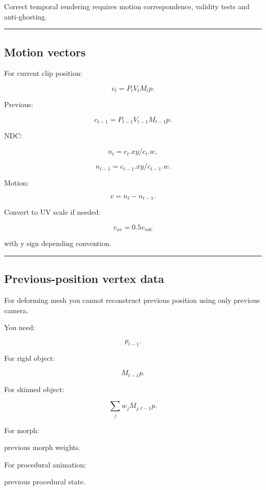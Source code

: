 Correct temporal rendering requires motion correspondence, validity tests and anti-ghosting.

\begin{center}\rule{0.5\linewidth}{0.5pt}\end{center}

\subsection{Motion vectors}\label{04-visual-computing-ii-ch040-motion-vectors}

For current clip position:

\[
c_t=
P_tV_tM_tp.
\]

Previous:

\[
c_{t-1}
=
P_{t-1}
V_{t-1}
M_{t-1}
p.
\]

NDC:

\[
n_t=
c_t.xy/c_t.w,
\]

\[
n_{t-1}
=
c_{t-1}.xy/c_{t-1}.w.
\]

Motion:

\[
\boxed{
v=
n_t-n_{t-1}.
}
\]

Convert to UV scale if needed:

\[
v_{uv}=0.5v_{ndc}
\]

with y sign depending convention.

\begin{center}\rule{0.5\linewidth}{0.5pt}\end{center}

\subsection{Previous-position vertex data}\label{04-visual-computing-ii-ch040-previous-position-vertex-data}

For deforming mesh you cannot reconstruct previous position using only previous camera.

You need:

\[
p_{t-1}.
\]

For rigid object:

\[
M_{t-1}p.
\]

For skinned object:

\[
\sum_j
w_j
M_{j,t-1}p.
\]

For morph:

previous morph weights.

For procedural animation:

previous procedural state.

